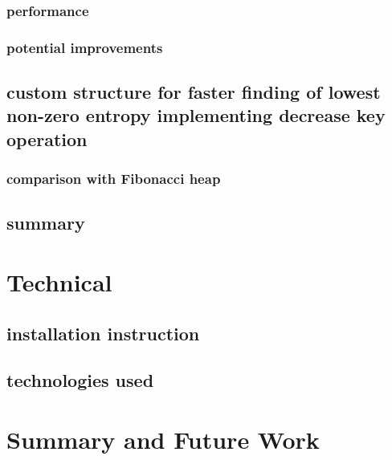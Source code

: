 \documentclass[shortabstract, english, inz]{iithesis}
\begin{document}
        \subsection{performance}
        \subsection{potential improvements}
    \section{custom structure for faster finding of lowest non-zero entropy implementing decrease key operation}
    \label{prioritybuckets}
        \subsection{comparison with Fibonacci heap}
    \section{summary}
\chapter{Technical}
\label{chapter5}
    \section{installation instruction}
    \section{technologies used}
\chapter{Summary and Future Work}
\label{chapter6}


\printbibliography[sorting=none]
\end{document}
